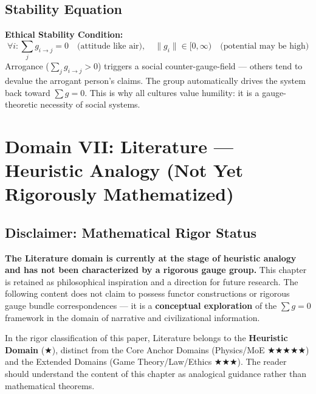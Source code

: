 \documentclass[12pt,a4paper]{article}
\theoremstyle{plain}
\theoremstyle{definition}
\begin{document}
\subsection{Stability Equation}

\begin{keyeq}
\textbf{Ethical Stability Condition:}
\begin{equation}
    \boxed{\forall i: \sum_j g_{i \to j} = 0 \quad \text{(attitude like air)}, \quad \|g_i\| \in [0, \infty) \quad \text{(potential may be high)}}
\end{equation}
Arrogance ($\sum_j g_{i \to j} > 0$) triggers a social counter-gauge-field — others tend to devalue the arrogant person's claims.
The group automatically drives the system back toward $\sum g = 0$. This is why all cultures value humility:
it is a gauge-theoretic necessity of social systems.
\end{keyeq}

\newpage


\section{Domain VII: Literature — Heuristic Analogy (Not Yet Rigorously Mathematized)}

\subsection{Disclaimer: Mathematical Rigor Status}

\begin{scxbox}
\textbf{The Literature domain is currently at the stage of heuristic analogy and has not been characterized by a rigorous gauge group.}
This chapter is retained as philosophical inspiration and a direction for future research. The following content does not claim to possess functor constructions or rigorous
gauge bundle correspondences — it is a \textbf{conceptual exploration} of the $\sum g = 0$ framework in the domain of narrative and civilizational information.

In the rigor classification of this paper, Literature belongs to the \textbf{Heuristic Domain} (★), distinct from the Core Anchor Domains (Physics/MoE ★★★★★)
and the Extended Domains (Game Theory/Law/Ethics ★★★). The reader should understand the content of this chapter as analogical guidance rather than mathematical theorems.
\end{scxbox}
\end{document}
